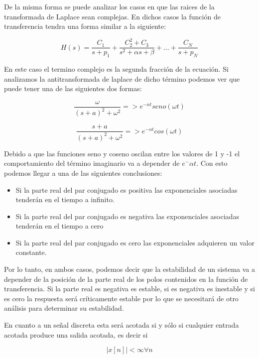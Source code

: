 De la misma forma se puede analizar los casos en que las raices de la transformada de Laplace sean complejas. En dichos casos la función de transferencia tendra una forma similar a la siguiente:

\begin{equation}
H(s)=\frac{C_1}{s+p_1}+\frac{C_2^2+C_3}{s^2+\alpha s+\beta}+...+\frac{C_N}{s+p_N}
\end{equation}

En este caso el termino complejo es la segunda fracción de la ecuación. Si analizamos la antitransformada de laplace de dicho término podemos ver que puede tener una de las siguientes dos formas:

\begin{equation}
\frac{\omega}{(s+a)^2+{\omega}^2} => e^{-\alpha t}seno(\omega t)
\end{equation}

\begin{equation}
\frac{s+a}{(s+a)^2+{\omega}^2} => e^{-\alpha t}cos(\omega t)
\end{equation}

Debido a que las funciones seno y coseno oscilan entre los valores de 1 y -1 el comportamiento del término imaginario va a depender de $e^-{\alpha t}$. Con esto podemos llegar a una de las siguientes conclusiones:

\begin{itemize}
\item Si la parte real del par conjugado es positiva las exponenciales asociadas tenderán en el tiempo a infinito.
\item Si la parte real del par conjugado es negativa las exponenciales asociadas tenderán en el tiempo a cero
\item Si la parte real del par conjugado es cero las exponenciales adquieren un valor constante.
\end{itemize}

Por lo tanto, en ambos casos, podemos decir que la estabilidad de un sistema va a depender de la posición de la parte real de los polos contenidos en la función de transferencia. Si la parte real es negativa es estable, si es negativa es inestable y si es cero la respuesta será críticamente estable por lo que se necesitará de otro análisis para determinar su estabilidad.

En cuanto a un señal discreta esta será acotada si y sólo si cualquier entrada acotada produce una salida acotada, es decir si

\begin{equation}
|x[n]|<\infty \forall n
\end{equation}

